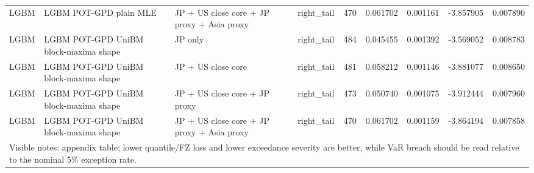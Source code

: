 \begin{tabular}{lll lrrrrr}
LGBM & LGBM POT-GPD plain MLE & JP + US close core + JP proxy + Asia proxy & right\_tail & 470 & 0.061702 & 0.001161 & -3.857905 & 0.007890 \\
LGBM & LGBM POT-GPD UniBM block-maxima shape & JP only & right\_tail & 484 & 0.045455 & 0.001392 & -3.569052 & 0.008783 \\
LGBM & LGBM POT-GPD UniBM block-maxima shape & JP + US close core & right\_tail & 481 & 0.058212 & 0.001146 & -3.881077 & 0.008650 \\
LGBM & LGBM POT-GPD UniBM block-maxima shape & JP + US close core + JP proxy & right\_tail & 473 & 0.050740 & 0.001075 & -3.912444 & 0.007960 \\
LGBM & LGBM POT-GPD UniBM block-maxima shape & JP + US close core + JP proxy + Asia proxy & right\_tail & 470 & 0.061702 & 0.001159 & -3.864194 & 0.007858 \\
\midrule
\multicolumn{9}{l}{\footnotesize Visible notes: appendix table; lower quantile/FZ loss and lower exceedance severity are better, while VaR breach should be read relative to the nominal 5\% exception rate.} \\
\bottomrule
\end{tabular}
